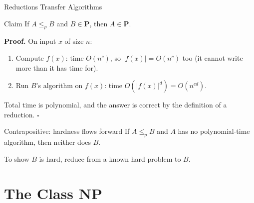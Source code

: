 \documentclass[10pt,aspectratio=169]{beamer}
\begin{document}
\begin{frame}{Reductions Transfer Algorithms}
  \begin{block}{Claim}
    If $A \le_p B$ and $B \in \mathbf{P}$, then $A \in \mathbf{P}$.
  \end{block}

  \textbf{Proof.} On input $x$ of size $n$:
  \begin{enumerate}
    \item Compute $f(x)$: time $O(n^c)$, so $|f(x)| = O(n^c)$ too (it cannot
          write more than it has time for).
    \item Run $B$'s algorithm on $f(x)$: time $O(|f(x)|^d) = O(n^{cd})$.
  \end{enumerate}
  Total time is polynomial, and the answer is correct by the definition of
  a reduction. \hfill $\square$

  \pause
  \bigskip
  \begin{block}{Contrapositive: hardness flows forward}
    If $A \le_p B$ and $A$ has no polynomial-time algorithm, then neither
    does $B$.
  \end{block}
  To show $B$ is hard, reduce \alert{from} a known hard problem \alert{to}
  $B$.
\end{frame}

\section{The Class NP}
\end{document}
